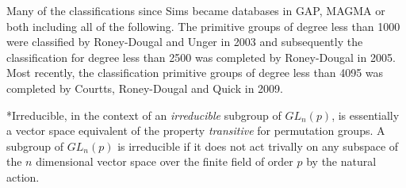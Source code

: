 \documentclass[]{article}
\theoremstyle{definition}
\begin{document}
Many of the classifications since Sims became databases in GAP, MAGMA or both including all of the following. The primitive groups of degree less than 1000 were classified by Roney-Dougal and Unger\cite{roney2} in 2003 and subsequently the classification for degree less than 2500 was completed by Roney-Dougal\cite{roney} in 2005. Most recently, the classification primitive groups of degree less than 4095 was completed by Courtts, Roney-Dougal and Quick\cite{courtts} in 2009.



*Irreducible, in the context of an \emph{irreducible} subgroup of $GL_n(p)$, is essentially a vector space equivalent of the property \emph{transitive} for permutation groups. A subgroup of $GL_n(p)$ is irreducible if it does not act trivally on any subspace of the $n$ dimensional vector space over the finite field of order $p$ by the natural action.
\end{document}
